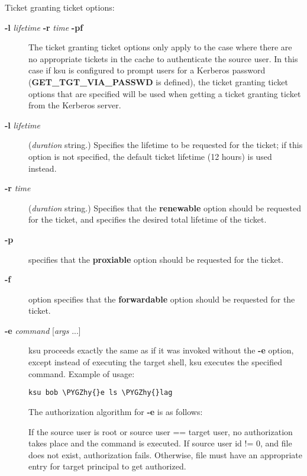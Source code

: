 \documentclass[letterpaper,10pt,english]{sphinxmanual}
\def\PYGZhy{\char`\-}
\begin{document}
Ticket granting ticket options:
\begin{description}
\item[{\textbf{-l} \emph{lifetime} \textbf{-r} \emph{time} \textbf{-pf}}] \leavevmode
The ticket granting ticket options only apply to the case where
there are no appropriate tickets in the cache to authenticate the
source user.  In this case if ksu is configured to prompt users
for a Kerberos password (\textbf{GET\_TGT\_VIA\_PASSWD} is defined), the
ticket granting ticket options that are specified will be used
when getting a ticket granting ticket from the Kerberos server.

\item[{\textbf{-l} \emph{lifetime}}] \leavevmode
(\emph{duration} string.)  Specifies the lifetime to be requested
for the ticket; if this option is not specified, the default ticket
lifetime (12 hours) is used instead.

\item[{\textbf{-r} \emph{time}}] \leavevmode
(\emph{duration} string.)  Specifies that the \textbf{renewable} option
should be requested for the ticket, and specifies the desired
total lifetime of the ticket.

\item[{\textbf{-p}}] \leavevmode
specifies that the \textbf{proxiable} option should be requested for
the ticket.

\item[{\textbf{-f}}] \leavevmode
option specifies that the \textbf{forwardable} option should be
requested for the ticket.

\item[{\textbf{-e} \emph{command} {[}\emph{args} ...{]}}] \leavevmode
ksu proceeds exactly the same as if it was invoked without the
\textbf{-e} option, except instead of executing the target shell, ksu
executes the specified command. Example of usage:

\begin{Verbatim}[commandchars=\\\{\}]
ksu bob \PYGZhy{}e ls \PYGZhy{}lag
\end{Verbatim}

The authorization algorithm for \textbf{-e} is as follows:

If the source user is root or source user == target user, no
authorization takes place and the command is executed.  If source
user id != 0, and  file does not exist,
authorization fails.  Otherwise,  file
must have an appropriate entry for target principal to get
authorized.


\end{description}
\end{document}
